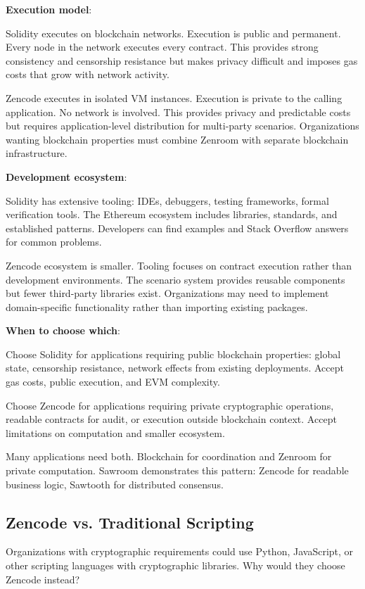 \textbf{Execution model}:

Solidity executes on blockchain networks. Execution is public and
permanent. Every node in the network executes every contract. This
provides strong consistency and censorship resistance but makes
privacy difficult and imposes gas costs that grow with network
activity.

Zencode executes in isolated VM instances. Execution is private to the
calling application. No network is involved. This provides privacy and
predictable costs but requires application-level distribution for
multi-party scenarios. Organizations wanting blockchain properties
must combine Zenroom with separate blockchain infrastructure.

\textbf{Development ecosystem}:

Solidity has extensive tooling: IDEs, debuggers, testing frameworks,
formal verification tools. The Ethereum ecosystem includes libraries,
standards, and established patterns. Developers can find examples and
Stack Overflow answers for common problems.

Zencode ecosystem is smaller. Tooling focuses on contract execution
rather than development environments. The scenario system provides
reusable components but fewer third-party libraries
exist. Organizations may need to implement domain-specific
functionality rather than importing existing packages.

\textbf{When to choose which}:

Choose Solidity for applications requiring public blockchain
properties: global state, censorship resistance, network effects from
existing deployments. Accept gas costs, public execution, and EVM
complexity.

Choose Zencode for applications requiring private cryptographic
operations, readable contracts for audit, or execution outside
blockchain context. Accept limitations on computation and smaller
ecosystem.

Many applications need both. Blockchain for coordination and Zenroom
for private computation. Sawroom demonstrates this pattern: Zencode
for readable business logic, Sawtooth for distributed consensus.

\subsection{Zencode vs. Traditional Scripting}

Organizations with cryptographic requirements could use Python,
JavaScript, or other scripting languages with cryptographic
libraries. Why would they choose Zencode instead?

